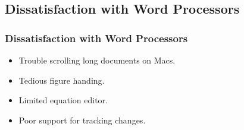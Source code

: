 \documentclass{beamer}
\begin{document}

\subsection{Dissatisfaction with Word Processors}
\begin{frame}
\frametitle{Dissatisfaction with Word Processors}
\begin{center}
\begin{Large}
\begin{itemize}[font=$\bullet$\scshape\bfseries]
\item Trouble scrolling long documents on Macs.
\item Tedious figure handing.
\item Limited equation editor.
\item Poor support for tracking changes.
\end{itemize}
\end{Large}
\end{center}
\end{frame}
\note{}


\end{document}
